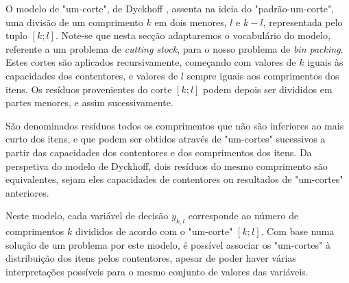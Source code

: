\documentclass[12pt, a4paper, titlepage]{article}
\begin{document}
O modelo de "um-corte"{}, de Dyckhoff \cite{dyckhoff}, assenta na ideia do "padrão-um-corte", uma
divisão de um comprimento $k$ em dois menores, $l$ e $k - l$, representada pelo tuplo $[k; l]$.
Note-se que nesta secção adaptaremos o vocabulário do modelo, referente a um problema de
\emph{cutting stock}, para o nosso problema de \emph{bin packing}. Estes cortes são aplicados
recursivamente, começando com valores de $k$ iguais às capacidades dos contentores, e valores de $l$
sempre iguais aos comprimentos dos itens. Os resíduos provenientes do corte $[k; l]$ podem depois
ser divididos em partes menores, e assim sucessivamente.

São denominados resíduos todos os comprimentos que não são inferiores ao mais curto dos itens, e
que podem ser obtidos através de "um-cortes"{} sucessivos a partir das capacidades dos contentores e
dos comprimentos dos itens. Da perspetiva do modelo de Dyckhoff, dois resíduos do mesmo comprimento
são equivalentes, sejam eles capacidades de contentores ou resultados de "um-cortes"{} anteriores.

Neste modelo, cada variável de decisão $y_{k, l}$ corresponde ao número de comprimentos $k$
divididos de acordo com o "um-corte"{} $[k; l]$. Com base numa solução de um problema por este
modelo, é possível associar os "um-cortes"{} à distribuição dos itens pelos contentores, apesar de
poder haver várias interpretações possíveis para o mesmo conjunto de valores das variáveis.

\bgroup
\renewcommand{\arraystretch}{0}
\end{document}
